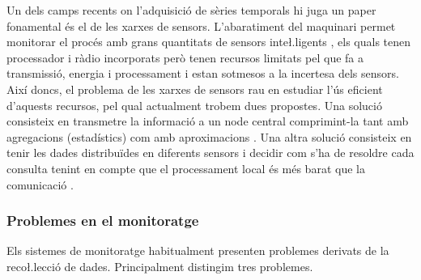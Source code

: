 Un dels camps recents on l'adquisició de sèries temporals hi juga un
paper fonamental és el de les xarxes de sensors. L'abaratiment del
maquinari permet monitorar el procés amb grans quantitats de sensors
inte\l.ligents \parencite{jainagrawal05,yaogehrke02}, els quals tenen
processador i ràdio incorporats però tenen recursos limitats pel que
fa a transmissió, energia i processament i estan sotmesos a la
incertesa dels sensors. Així doncs, el problema de les xarxes de
sensors rau en estudiar l'ús eficient d'aquests recursos, pel qual
actualment trobem dues propostes.  Una solució consisteix en
transmetre la informació a un node central comprimint-la tant amb
agregacions (estadístics) com amb
aproximacions \parencite{deligiannakis07}.  Una altra solució
consisteix en tenir les dades distribuïdes en diferents sensors i
decidir com s'ha de resoldre cada consulta tenint en compte que el
processament local és més barat que la
comunicació \parencite{yaogehrke02,gehrkemadden04,bonnet01}.





\subsubsection{Problemes en el monitoratge}

Els sistemes de monitoratge habitualment presenten problemes derivats
de la reco\l.lecció de dades. Principalment distingim tres problemes.

